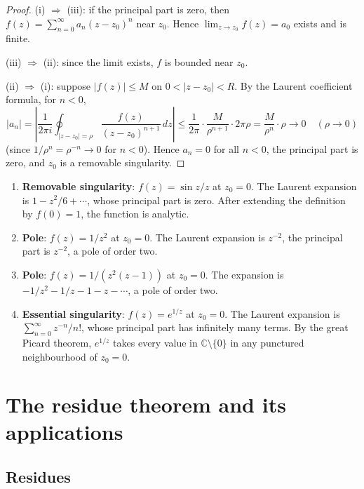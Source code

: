 \begin{proof}
(i) $\Rightarrow$ (iii): if the principal part is zero, then $f(z) = \sum_{n=0}^{\infty} a_n (z - z_0)^n$ near $z_0$. Hence $\lim_{z \to z_0} f(z) = a_0$ exists and is finite.

(iii) $\Rightarrow$ (ii): since the limit exists, $f$ is bounded near $z_0$.

(ii) $\Rightarrow$ (i): suppose $|f(z)| \le M$ on $0 < |z - z_0| < R$. By the Laurent coefficient formula, for $n < 0$,
\[
|a_n| = \left| \frac{1}{2\pi i} \oint_{|z - z_0| = \rho} \frac{f(z)}{(z - z_0)^{n+1}} \, dz \right| \le \frac{1}{2\pi} \cdot \frac{M}{\rho^{n+1}} \cdot 2\pi \rho = \frac{M}{\rho^n} \cdot \rho \to 0 \quad (\rho \to 0)
\]
(since $1/\rho^n = \rho^{-n} \to 0$ for $n < 0$). Hence $a_n = 0$ for all $n < 0$, the principal part is zero, and $z_0$ is a removable singularity.
\end{proof}

\begin{example}\label{ex:ca_singularity_examples}
\begin{enumerate}[label=(\roman*)]
    \item \textbf{Removable singularity}: $f(z) = \sin z / z$ at $z_0 = 0$. The Laurent expansion is $1 - z^2/6 + \cdots$, whose principal part is zero. After extending the definition by $f(0) = 1$, the function is analytic.
    \item \textbf{Pole}: $f(z) = 1/z^2$ at $z_0 = 0$. The Laurent expansion is $z^{-2}$, the principal part is $z^{-2}$, a pole of order two.
    \item \textbf{Pole}: $f(z) = 1/(z^2(z-1))$ at $z_0 = 0$. The expansion is $-1/z^2 - 1/z - 1 - z - \cdots$, a pole of order two.
    \item \textbf{Essential singularity}: $f(z) = e^{1/z}$ at $z_0 = 0$. The Laurent expansion is $\sum_{n=0}^{\infty} z^{-n}/n!$, whose principal part has infinitely many terms. By the great Picard theorem, $e^{1/z}$ takes every value in $\mathbb{C} \setminus \{0\}$ in any punctured neighbourhood of $z_0 = 0$.
\end{enumerate}
\end{example}

\section{The residue theorem and its applications}

\subsection{Residues}

